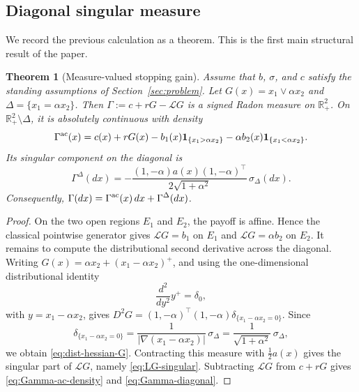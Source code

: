 \documentclass[pdflatex,sn-mathphys-num]{sn-jnl}
\theoremstyle{plain}
\newtheorem{theorem}{Theorem}[section]
\theoremstyle{definition}
\theoremstyle{remark}
\numberwithin{equation}{section}
\begin{document}
\subsection{Diagonal singular measure} \label{subsec:diagonal-singular-measure} 

We record the previous calculation as a theorem. This is the first main structural result of the paper. 
\begin{theorem}[Measure-valued stopping gain] \label{thm:measure-valued-gain} 
Assume that \(b\), \(\sigma\), and \(c\) satisfy the standing assumptions of Section~\ref{sec:problem}. Let 
$\displaystyle G(x)=x_1\vee \alpha x_2$ and $\Delta=\{x_1=\alpha x_2\}$. 
Then 
$\displaystyle \Gamma:=c+rG-\mathcal LG$ 
is a signed Radon measure on \(\mathbb R_+^2\). On \(\mathbb R_+^2\setminus\Delta\), it is absolutely continuous with density 
\begin{equation} \label{eq:Gamma-ac-density} 
\Gamma^{\rm ac}(x) = c(x)+rG(x) - b_1(x)\mathbf 1_{\{x_1>\alpha x_2\}} - \alpha b_2(x)\mathbf 1_{\{x_1<\alpha x_2\}} . 
\end{equation} 
Its singular component on the diagonal is 
\begin{equation} \label{eq:Gamma-diagonal} 
\Gamma^\Delta(dx) = - \frac{ (1,-\alpha)a(x)(1,-\alpha)^\top } {2\sqrt{1+\alpha^2}}\,\sigma_\Delta(dx). 
\end{equation} 
Consequently, 
$\displaystyle \Gamma(dx) = \Gamma^{\rm ac}(x)\,dx + \Gamma^\Delta(dx)$. 
\end{theorem} 

\begin{proof} 
On the two open regions \(E_1\) and \(E_2\), the payoff is affine. Hence the classical pointwise generator gives 
$\mathcal LG=b_1$ on $E_1$ and $\mathcal LG=\alpha b_2$ on $E_2$. 
It remains to compute the distributional second derivative across the diagonal. Writing 
$G(x)=\alpha x_2+(x_1-\alpha x_2)^+$, 
and using the one-dimensional distributional identity 
\[ \frac{d^2}{dy^2}y^+=\delta_0, \] 
with \(y=x_1-\alpha x_2\), gives 
$\displaystyle D^2G = (1,-\alpha)^\top(1,-\alpha) \delta_{\{x_1-\alpha x_2=0\}}$.
Since 
\[ \delta_{\{x_1-\alpha x_2=0\}} = \frac{1}{|\nabla(x_1-\alpha x_2)|}\,\sigma_\Delta = \frac{1}{\sqrt{1+\alpha^2}}\,\sigma_\Delta , \] 
we obtain \eqref{eq:dist-hessian-G}. Contracting this measure with \(\frac12 a(x)\) gives the singular part of \(\mathcal LG\), namely \eqref{eq:LG-singular}. Subtracting \(\mathcal LG\) from \(c+rG\) gives \eqref{eq:Gamma-ac-density} and \eqref{eq:Gamma-diagonal}. 
\end{proof} 
\end{document}
